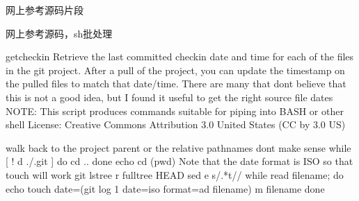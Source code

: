 \documentclass[letterpaper,12pt,english]{sphinxmanual}
\begin{document}
网上参考源码片段

\begin{sphinxVerbatim}[commandchars=\\\{\}]


\end{sphinxVerbatim}

网上参考源码，sh批处理

\begin{sphinxVerbatim}[commandchars=\\\{\}]
\PYGZsh{} getcheckin \PYGZhy{} Retrieve the last committed checkin date and time for
\PYGZsh{}              each of the files in the git project.  After a \PYGZdq{}pull\PYGZdq{}
\PYGZsh{}              of the project, you can update the timestamp on the
\PYGZsh{}              pulled files to match that date/time.  There are many
\PYGZsh{}              that don\PYGZsq{}t believe that this is not a good idea, but
\PYGZsh{}              I found it useful to get the right source file dates
\PYGZsh{}
\PYGZsh{}              NOTE: This script produces commands suitable for
\PYGZsh{}                    piping into BASH or other shell
\PYGZsh{} License: Creative Commons Attribution 3.0 United States
\PYGZsh{} (CC by 3.0 US)

\PYGZsh{}\PYGZsh{}\PYGZsh{}\PYGZsh{}\PYGZsh{}\PYGZsh{}\PYGZsh{}\PYGZsh{}\PYGZsh{}\PYGZsh{}
\PYGZsh{} walk back to the project parent or the relative pathnames don\PYGZsq{}t make
\PYGZsh{} sense
\PYGZsh{}\PYGZsh{}\PYGZsh{}\PYGZsh{}\PYGZsh{}\PYGZsh{}\PYGZsh{}\PYGZsh{}\PYGZsh{}\PYGZsh{}
while [ ! \PYGZhy{}d ./.git ]
do
    cd ..
done
echo \PYGZdq{}cd \PYGZdl{}(pwd)\PYGZdq{}
\PYGZsh{}\PYGZsh{}\PYGZsh{}\PYGZsh{}\PYGZsh{}\PYGZsh{}\PYGZsh{}\PYGZsh{}\PYGZsh{}\PYGZsh{}
\PYGZsh{} Note that the date format is ISO so that touch will work
\PYGZsh{}\PYGZsh{}\PYGZsh{}\PYGZsh{}\PYGZsh{}\PYGZsh{}\PYGZsh{}\PYGZsh{}\PYGZsh{}\PYGZsh{}
git ls\PYGZhy{}tree \PYGZhy{}r \PYGZhy{}\PYGZhy{}full\PYGZhy{}tree HEAD \textbar{}\PYGZbs{}
    sed \PYGZhy{}e \PYGZdq{}s/.*\PYGZbs{}t//\PYGZdq{} \textbar{} while read filename; do
    echo \PYGZdq{}touch \PYGZhy{}\PYGZhy{}date=\PYGZbs{}\PYGZdq{}\PYGZdl{}(git log \PYGZhy{}1 \PYGZhy{}\PYGZhy{}date=iso \PYGZhy{}\PYGZhy{}format=\PYGZdq{}\PYGZpc{}ad\PYGZdq{} \PYGZhy{}\PYGZhy{}   \PYGZdq{}\PYGZdl{}filename\PYGZdq{})\PYGZbs{}\PYGZdq{} \PYGZhy{}m \PYGZdl{}filename\PYGZdq{}
done
\end{sphinxVerbatim}
\end{document}

